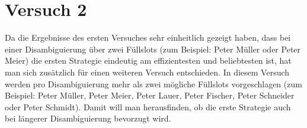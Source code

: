 \documentclass[12pt,a4paper]{scrartcl}
\begin{document}

\newpage
\section{Versuch 2}
\label{Verusch2}
Da die Ergebnisse des ersten Versuches sehr einheitlich gezeigt haben, dass bei einer Disambiguierung über zwei Füllslots (zum Beispiel: Peter Müller oder Peter Meier) die ersten Strategie eindeutig am effizientesten und beliebtesten ist, hat man sich zusätzlich für einen weiteren Versuch entschieden. In diesem Versuch werden pro Disambiguierung mehr als zwei mögliche Füllslots vorgeschlagen (zum Beispiel: Peter Müller, Peter Meier, Peter Lauer, Peter Fischer, Peter Schneider oder Peter Schmidt). Damit will man herausfinden, ob die erste Strategie auch bei längerer Disambiguierung bevorzugt wird.
\end{document}
